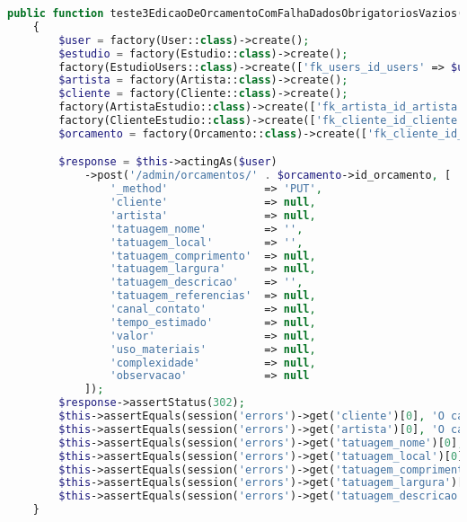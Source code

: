 \begin{lstlisting}[language=PHP, caption= Scripts de teste de Edição de Orçamentos, nolol,
label={code:EdicaoDeOrcamentoTest}]
    public function teste3EdicaoDeOrcamentoComFalhaDadosObrigatoriosVazios()
    {
        $user = factory(User::class)->create();
        $estudio = factory(Estudio::class)->create();
        factory(EstudioUsers::class)->create(['fk_users_id_users' => $user->id, 'fk_estudio_id_estudio' => $estudio->id_estudio]);
        $artista = factory(Artista::class)->create();
        $cliente = factory(Cliente::class)->create();
        factory(ArtistaEstudio::class)->create(['fk_artista_id_artista' => $artista->id_artista, 'fk_estudio_id_estudio' => $estudio->id_estudio]);
        factory(ClienteEstudio::class)->create(['fk_cliente_id_cliente' => $cliente->id_cliente, 'fk_estudio_id_estudio' => $estudio->id_estudio]);
        $orcamento = factory(Orcamento::class)->create(['fk_cliente_id_cliente' => $cliente->id_cliente, 'fk_artista_id_artista' => $artista->id_artista, 'fk_estudio_id_estudio' => $estudio->id_estudio, 'fk_orcamento_status_id_orcamento_status' => 1]);

        $response = $this->actingAs($user)
            ->post('/admin/orcamentos/' . $orcamento->id_orcamento, [
                '_method'               => 'PUT',
                'cliente'               => null,
                'artista'               => null,
                'tatuagem_nome'         => '',
                'tatuagem_local'        => '',
                'tatuagem_comprimento'  => null,
                'tatuagem_largura'      => null,
                'tatuagem_descricao'    => '',
                'tatuagem_referencias'  => null,
                'canal_contato'         => null,
                'tempo_estimado'        => null,
                'valor'                 => null,
                'uso_materiais'         => null,
                'complexidade'          => null,
                'observacao'            => null
            ]);
        $response->assertStatus(302);
        $this->assertEquals(session('errors')->get('cliente')[0], 'O campo cliente é obrigatório.');
        $this->assertEquals(session('errors')->get('artista')[0], 'O campo artista é obrigatório.');
        $this->assertEquals(session('errors')->get('tatuagem_nome')[0], 'O campo tatuagem nome é obrigatório.');
        $this->assertEquals(session('errors')->get('tatuagem_local')[0], 'O campo tatuagem local é obrigatório.');
        $this->assertEquals(session('errors')->get('tatuagem_comprimento')[0], 'O campo tatuagem comprimento é obrigatório.');
        $this->assertEquals(session('errors')->get('tatuagem_largura')[0], 'O campo tatuagem largura é obrigatório.');
        $this->assertEquals(session('errors')->get('tatuagem_descricao')[0], 'O campo tatuagem descricao é obrigatório.');
    }


\end{lstlisting}
